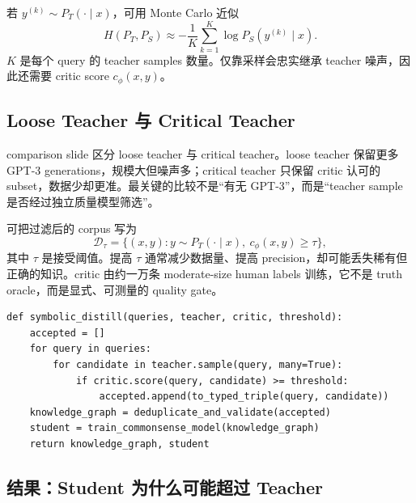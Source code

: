 
若 $y^{(k)}\sim P_T(\cdot\mid x)$，可用 Monte Carlo 近似
\begin{equation}
H(P_T,P_S)\approx -\frac{1}{K}\sum_{k=1}^{K}
\log P_S\!\left(y^{(k)}\mid x\right).
\end{equation}
$K$ 是每个 query 的 teacher samples 数量。仅靠采样会忠实继承 teacher 噪声，因此还需要 critic score $c_\phi(x,y)$。

\subsection{Loose Teacher 与 Critical Teacher}

comparison slide 区分 loose teacher 与 critical teacher。loose teacher 保留更多 GPT-3 generations，规模大但噪声多；critical teacher 只保留 critic 认可的 subset，数据少却更准。最关键的比较不是“有无 GPT-3”，而是“teacher sample 是否经过独立质量模型筛选”。


可把过滤后的 corpus 写为
\begin{equation}
\mathcal{D}_{\tau}=\{(x,y):y\sim P_T(\cdot\mid x),\ c_{\phi}(x,y)\ge\tau\},
\end{equation}
其中 $\tau$ 是接受阈值。提高 $\tau$ 通常减少数据量、提高 precision，却可能丢失稀有但正确的知识。critic 由约一万条 moderate-size human labels 训练，它不是 truth oracle，而是显式、可测量的 quality gate。

\begin{lstlisting}[caption={Symbolic Knowledge Distillation 的数据与训练流程}]
def symbolic_distill(queries, teacher, critic, threshold):
    accepted = []
    for query in queries:
        for candidate in teacher.sample(query, many=True):
            if critic.score(query, candidate) >= threshold:
                accepted.append(to_typed_triple(query, candidate))
    knowledge_graph = deduplicate_and_validate(accepted)
    student = train_commonsense_model(knowledge_graph)
    return knowledge_graph, student
\end{lstlisting}

\subsection{结果：Student 为什么可能超过 Teacher}


